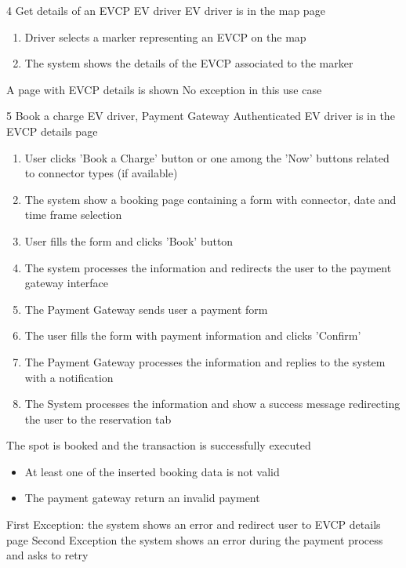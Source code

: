 \usecase
{4}
{Get details of an EVCP}
{EV driver}
{EV driver is in the map page}
{
    \begin{enumerate}
        \item Driver selects a marker representing an EVCP on the map
        \item The system shows the details of the EVCP associated to the marker
    \end{enumerate}
}
{A page with EVCP details is shown}
{
    No exception in this use case
}
{
}

\usecase
{5}
{Book a charge}
{EV driver, Payment Gateway}
{Authenticated EV driver is in the EVCP details page}
{
    \begin{enumerate}
        \item User clicks 'Book a Charge' button or one among the 'Now' buttons related to connector types (if available)
        \item The system show a booking page containing a form with connector, date and time frame selection
        \item User fills the form and clicks 'Book' button
        \item The system processes the information and redirects the user to the payment gateway interface
        \item The Payment Gateway sends user a payment form
        \item The user fills the form with payment information and clicks 'Confirm'
        \item The Payment Gateway processes the information and replies to the system with a notification
        \item The System processes the information and show a success message redirecting the user to the reservation tab
    \end{enumerate}
}
{The spot is booked and the transaction is successfully executed}
{
    \begin{itemize}
        \item At least one of the inserted booking data is not valid
        \item The payment gateway return an invalid payment
    \end{itemize}
}
{
    First Exception: the system shows an error and redirect user to EVCP details page
    Second Exception the system shows an error during the payment process and asks to retry
}

